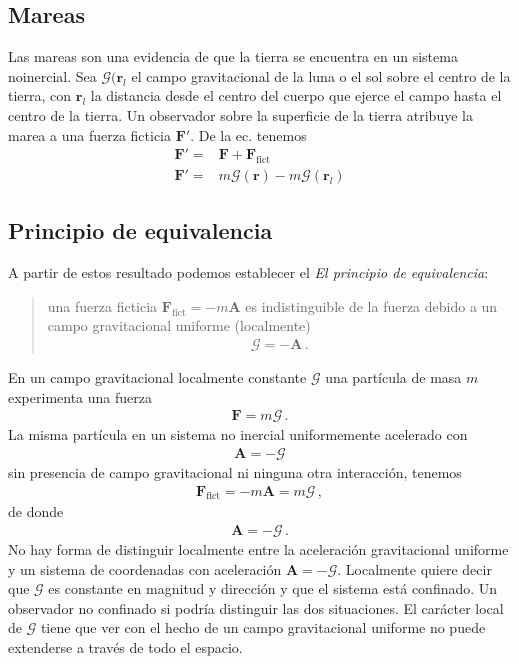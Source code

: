 \subsection{Mareas}
Las mareas son una evidencia de que la tierra se encuentra en un sistema noinercial. Sea $\boldsymbol{\mathcal{G}}(\mathbf{r}_{l}$ el campo gravitacional de la luna o el sol sobre el centro  de la tierra, con $\mathbf{r}_{l}$ la distancia desde el centro del cuerpo que ejerce el campo hasta el centro de la tierra. Un observador sobre la superficie de la tierra atribuye la marea a una fuerza ficticia $\mathbf{F}'$. De la ec.%
tenemos
\begin{align}
  \mathbf{F}'=&\mathbf{F}+\mathbf{F}_{\text{fict}}\nonumber\\
  \mathbf{F}'=&m \boldsymbol{\mathcal{G}}(\mathbf{r})-m \boldsymbol{\mathcal{G}}(\mathbf{r}_l)
\end{align}

\subsection{Principio de equivalencia}



A partir de estos resultado podemos establecer el \emph{El principio de equivalencia}:
\begin{quote}
una fuerza ficticia $\mathbf{F}_{\text{fict}}=-m\mathbf{A}$ es indistinguible de la fuerza debido a un campo gravitacional uniforme (localmente)
\begin{align*}
  \boldsymbol{\mathcal{G}}=-\mathbf{A}\,.
\end{align*}
\end{quote}
En un campo gravitacional localmente constante $\boldsymbol{\mathcal{G}}$ una partícula de masa $m$ experimenta una fuerza
\begin{align*}
  \mathbf{F}=m\boldsymbol{\mathcal{G}}\,.
\end{align*}
La misma partícula en un sistema no inercial uniformemente acelerado con
\begin{align*}
  \mathbf{A}=-\boldsymbol{\mathcal{G}}
\end{align*}
sin presencia de campo gravitacional ni ninguna otra interacción, tenemos
\begin{align*}
   \mathbf{F}_{\text{fict}}=-m\mathbf{A}=m\boldsymbol{\mathcal{G}}\,,
\end{align*}
de donde
\begin{align*}
  \mathbf{A}=-\boldsymbol{\mathcal{G}}\,.
\end{align*}
No hay forma de distinguir localmente entre la aceleración gravitacional uniforme y un sistema de coordenadas con aceleración $\mathbf{A}=-\boldsymbol{\mathcal{G}}$. Localmente quiere decir que $\boldsymbol{\mathcal{G}}$ es constante en magnitud y dirección y que el sistema está confinado. Un observador no confinado si podría distinguir las dos situaciones. El carácter local de $\boldsymbol{\mathcal{G}}$ tiene que ver con el hecho de un campo gravitacional uniforme no puede extenderse a través de todo el espacio. 

